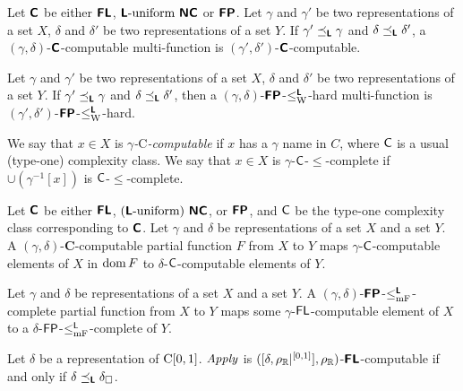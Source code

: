 \documentclass[envcountsame,orivec,oribibl]{llncs}
\begin{document}
\begin{lemma}
 Let $\text{\bfseries \sffamily \upshape C}$ be either $\text{\bfseries \sffamily \upshape FL}$, $\text{\bfseries \sffamily \upshape L}\text{-uniform}\ \text{\bfseries \sffamily \upshape NC}$ or
 $\text{\bfseries \sffamily \upshape FP}$.
 Let $\gamma$ and $\gamma'$ be two representations of a set $X$, 
 $\delta$ and $\delta'$ be two representations of a set $Y$.
 If $\gamma' \preceq_{\text{\bfseries \sffamily \upshape L}} \gamma$ and $\delta \preceq_{\text{\bfseries \sffamily \upshape L}} \delta'$,
 a $(\gamma, \delta)$-$\text{\bfseries \sffamily \upshape C}$-computable multi-function is
 $(\gamma', \delta')$-$\text{\bfseries \sffamily \upshape C}$-computable.
\end{lemma}

\begin{lemma}
 Let $\gamma$ and $\gamma'$ be two representations of a set $X$, 
 $\delta$ and $\delta'$ be two representations of a set $Y$.
 If $\gamma' \preceq_{\text{\bfseries \sffamily \upshape L}} \gamma$ and $\delta \preceq_{\text{\bfseries \sffamily \upshape L}} \delta'$,
 then a $(\gamma, \delta)$-$\text{\bfseries \sffamily \upshape FP}$-$\leq _{\mathrm W} ^{\text{\bfseries \sffamily \upshape L}}$-hard multi-function is
 $(\gamma', \delta')$-$\text{\bfseries \sffamily \upshape FP}$-$\leq _{\mathrm W} ^{\text{\bfseries \sffamily \upshape L}}$-hard.
\end{lemma}

We say that $x \in X$ is \emph{$\gamma$-$\mathrm C$-computable} if
$x$ has a $\gamma$ name in $C$,
where $\mathsf{C}$ is a usual (type-one) complexity class.
We say that $x \in X$ is $\gamma$-$\mathsf{C}$-$\le$-complete if
$\cup(\gamma^{-1}[x])$ is $\mathsf{C}$-$\le$-complete.

\begin{lemma}
 Let $\text{\bfseries \sffamily \upshape C}$ be either $\text{\bfseries \sffamily \upshape FL}$, $(\text{\bfseries \sffamily \upshape L}\text{-uniform})\ \text{\bfseries \sffamily \upshape NC}$, 
 or $\text{\bfseries \sffamily \upshape FP}$, and $\mathsf{C}$ be the type-one complexity class
 corresponding to $\text{\bfseries \sffamily \upshape C}$.
 Let $\gamma$ and $\delta$ be representations of a set $X$ and a set $Y$.
 A $(\gamma, \delta)$-$\mathbf C$-computable partial function $F$ from $X$
 to $Y$ maps $\gamma$-$\mathsf{C}$-computable elements of $X$
 in $\mathop{\rm dom} F$ to $\delta$-$\mathsf{C}$-computable elements of $Y$.
\end{lemma}

\begin{lemma}
 \label{lemma:p-comp-maps-l-to-p-comp}
 Let $\gamma$ and $\delta$ be representations of a set $X$ and a set $Y$.
 A $(\gamma, \delta)$-$\text{\bfseries \sffamily \upshape FP}$-$\leq _{\mathrm{mF}} ^{\text{\bfseries \sffamily \upshape L}}$-complete partial function 
 from $X$ to $Y$ maps some $\gamma$-$\mathsf{FL}$-computable element of $X$
 to a $\delta$-$\mathsf{FP}$-$\leq _{\mathrm{mF}}^{\mathsf{L}}$-complete of $Y$.
\end{lemma}



\begin{theorem}
 \label{theorem:apply-is-L-computable}
 Let $\delta$ be a representation of $\mathrm C[0, 1]$.
 $\mathit{Apply}$ is $([\delta, \rho _\mathbb R|^{[0,1]}], \rho _\mathbb R)$-$\text{\bfseries \sffamily \upshape FL}$-computable if
 and only if $\delta \preceq_{\text{\bfseries \sffamily \upshape L}} \delta _\square$.
\end{theorem}
\end{document}
